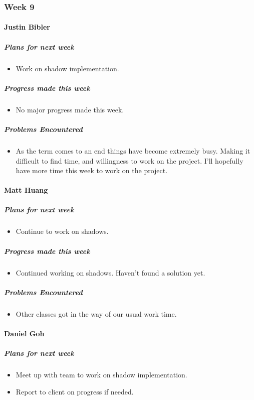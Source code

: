 {
\subsubsection{Week 9}
\paragraph{Justin Bibler}
\subparagraph{Plans for next week}
\begin{itemize}
  \item Work on shadow implementation.
\end{itemize}

\subparagraph{Progress made this week}
\begin{itemize}
  \item No major progress made this week.
\end{itemize}

\subparagraph{Problems Encountered}
\begin{itemize}
  \item  As the term comes to an end things have become extremely busy. Making it difficult to find time, and willingness to work on the project. I'll hopefully have more time this week to work on the project.
\end{itemize}
\vspace{3mm}

\paragraph{Matt Huang}
\subparagraph{Plans for next week}
\begin{itemize}
  \item Continue to work on shadows.
\end{itemize}

\subparagraph{Progress made this week}
\begin{itemize}
  \item Continued working on shadows. Haven't found a solution yet.
\end{itemize}

\subparagraph{Problems Encountered}
\begin{itemize}
  \item Other classes got in the way of our usual work time.
\end{itemize}
\vspace{3mm}

\paragraph{Daniel Goh}
\subparagraph{Plans for next week}
\begin{itemize}
  \item Meet up with team to work on shadow implementation.
  \item Report to client on progress if needed.
\end{itemize}

}
